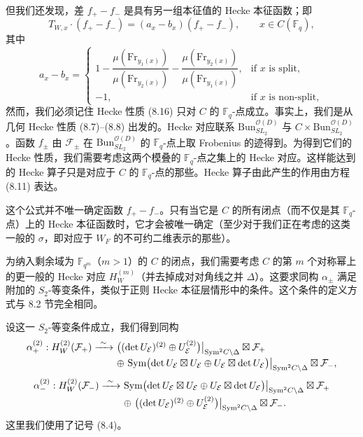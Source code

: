 \documentclass[11pt,a4paper]{article}
\newcommand{\Bun}{\mathrm{Bun}}
\begin{document}
但我们还发现，差 $f_+ - f_-$ 是具有另一组本征值的 Hecke 本征函数；即
\begin{equation}\tag{8.16}
T_{W,x}\cdot (f_+ - f_-) = (a_x - b_x)(f_+ - f_-), \qquad x\in C(\mathbb{F}_q),
\end{equation}
其中
\begin{equation}\tag{8.17}
a_x - b_x = \begin{cases} 1 - \dfrac{\mu(\mathrm{Fr}_{y_1(x)})}{\mu(\mathrm{Fr}_{y_2(x)})} - \dfrac{\mu(\mathrm{Fr}_{y_2(x)})}{\mu(\mathrm{Fr}_{y_1(x)})}, & \text{if } x \text{ is split},\\[10pt] -1, & \text{if } x \text{ is non-split},\end{cases}
\end{equation}
然而，我们必须记住 Hecke 性质 (8.16) 只对 $C$ 的 $\mathbb{F}_q$-点成立。事实上，我们是从几何 Hecke 性质 (8.7)--(8.8) 出发的。Hecke 对应联系 $\Bun^{\mathcal{O}(D)}_{SL_2}$ 与 $C\times \Bun^{\mathcal{O}(D)}_{SL_2}$。函数 $f_\pm$ 由 $\mathcal{F}_\pm$ 在 $\Bun^{\mathcal{O}(D)}_{SL_2}$ 的 $\mathbb{F}_q$-点上取 Frobenius 的迹得到。为得到它们的 Hecke 性质，我们需要考虑这两个模叠的 $\mathbb{F}_q$-点之集上的 Hecke 对应。这样能达到的 Hecke 算子只是对应于 $C$ 的 $\mathbb{F}_q$-点的那些。Hecke 算子由此产生的作用由方程 (8.11) 表达。

这个公式并不唯一确定函数 $f_+ - f_-$。只有当它是 $C$ 的所有闭点（而不仅是其 $\mathbb{F}_q$-点）上的 Hecke 本征函数时，它才会被唯一确定（至少对于我们正在考虑的这类一般的 $\sigma$，即对应于 $W_F$ 的不可约二维表示的那些）。

为纳入剩余域为 $\mathbb{F}_{q^m}$（$m > 1$）的 $C$ 的闭点，我们需要考虑 $C$ 的第 $m$ 个对称幂上的更一般的 Hecke 对应 $H_W^{(m)}$（并去掉成对对角线之并 $\Delta$）。这要求同构 $\alpha_\pm$ 满足附加的 $S_2$-等变条件，类似于正则 Hecke 本征层情形中的条件。这个条件的定义方式与 8.2 节完全相同。

设这一 $S_2$-等变条件成立，我们得到同构
\[
\begin{array}{r@{\ }l}
\alpha_+^{(2)} : H_W^{(2)}(\mathcal{F}_+) \xrightarrow{\ \sim\ } & \bigl((\det U_{\mathcal{E}})^{(2)}\oplus U_{\mathcal{E}}^{(2)}\bigr)\big|_{\mathrm{Sym}^2 C\setminus\Delta}\boxtimes \mathcal{F}_+\\[4pt]
& \oplus\ \mathrm{Sym}\bigl(\det U_{\mathcal{E}}\boxtimes U_{\mathcal{E}}\oplus U_{\mathcal{E}}\boxtimes \det U_{\mathcal{E}}\bigr)\big|_{\mathrm{Sym}^2 C\setminus\Delta}\boxtimes \mathcal{F}_-,
\end{array}
\]
\[
\begin{array}{r@{\ }l}
\alpha_-^{(2)} : H_W^{(2)}(\mathcal{F}_-) \xrightarrow{\ \sim\ } & \mathrm{Sym}\bigl(\det U_{\mathcal{E}}\boxtimes U_{\mathcal{E}}\oplus U_{\mathcal{E}}\boxtimes \det U_{\mathcal{E}}\bigr)\big|_{\mathrm{Sym}^2 C\setminus\Delta}\boxtimes \mathcal{F}_+\\[4pt]
& \oplus\ \bigl((\det U_{\mathcal{E}})^{(2)}\oplus U_{\mathcal{E}}^{(2)}\bigr)\big|_{\mathrm{Sym}^2 C\setminus\Delta}\boxtimes \mathcal{F}_-.
\end{array}
\]
这里我们使用了记号 (8.4)。
\end{document}
